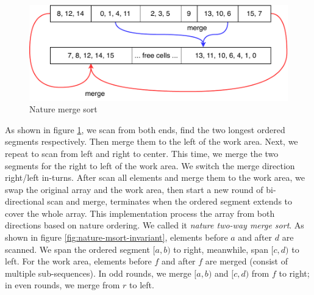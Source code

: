 \documentclass[b5paper]{article}
\begin{document}
\begin{figure}[htbp]
 \centering
 \includegraphics[scale=0.7]{img/nature-merge-sort}
 \caption{Nature merge sort}
 \label{fig:nature-merge-sort}
\end{figure}

As shown in figure \cref{fig:nature-merge-sort}, we scan from both ends, find the two longest ordered segments respectively. Then merge them to the left of the work area. Next, we repeat to scan from left and right to center. This time, we merge the two segments for the right to left of the work area. We switch the merge direction right/left in-turns. After scan all elements and merge them to the work area, we swap the original array and the work area, then start a new round of bi-directional scan and merge, terminates when the ordered segment extends to cover the whole array. This implementation process the array from both directions based on nature ordering. We called it {\em nature two-way merge sort}. As shown in figure \cref{fig:nature-msort-invariant}, elements before $a$ and after $d$ are scanned. We span the ordered segment $[a, b)$ to right, meanwhile, span $[c, d)$ to left. For the work area, elements before $f$ and after $f$ are merged (consist of multiple sub-sequences). In odd rounds, we merge $[a, b)$ and $[c, d)$ from $f$ to right; in even rounds, we merge from $r$ to left.
\end{document}
